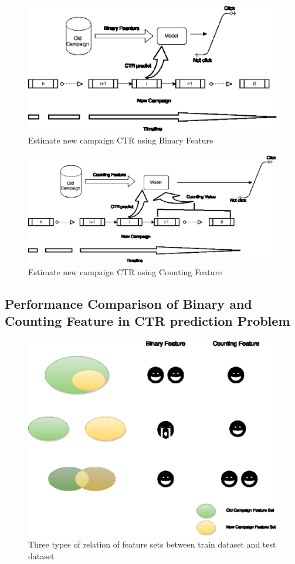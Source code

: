 \documentclass{sig-alternate}
\begin{document}
\begin{figure}[t]
\centering
\includegraphics[width=\columnwidth]{binaryrepresent.eps}
\caption{Estimate new campaign CTR using Binary Feature}
\label{fig:binary}
\end{figure}

\begin{figure}[h]
\centering
\includegraphics[width=\columnwidth]{counting.eps}
\caption{Estimate new campaign CTR using Counting Feature}
\label{fig:counting}
\end{figure}


\subsection{Performance Comparison of Binary and Counting Feature in CTR prediction Problem}
\begin{figure}[h]
\centering
\includegraphics[width=\columnwidth]{Datasetbias.eps}
\caption{Three types of relation of feature sets between train dataset and test dataset}
\label{fig:datasetbias}
\end{figure}
\end{document}
